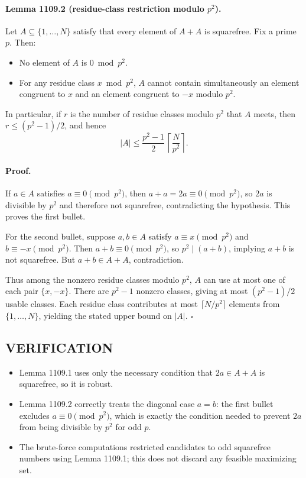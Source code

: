 \paragraph{Lemma 1109.2 (residue-class restriction modulo $p^2$).}
Let $A\subseteq\{1,\dots,N\}$ satisfy that every element of $A+A$ is squarefree.
Fix a prime $p$.
Then:
\begin{itemize}
\item No element of $A$ is $0\bmod p^2$.
\item For any residue class $x\bmod p^2$, $A$ cannot contain simultaneously an element congruent to $x$ and an element congruent to $-x$ modulo $p^2$.
\end{itemize}
In particular, if $r$ is the number of residue classes modulo $p^2$ that $A$ meets, then $r\le (p^2-1)/2$, and hence
\[|A|\le \frac{p^2-1}{2}\,\left\lceil \frac{N}{p^2}\right\rceil.
\]

\paragraph{Proof.}
If $a\in A$ satisfies $a\equiv 0\pmod{p^2}$, then $a+a=2a\equiv 0\pmod{p^2}$, so $2a$ is divisible by $p^2$ and therefore not squarefree, contradicting the hypothesis. This proves the first bullet.

For the second bullet, suppose $a,b\in A$ satisfy $a\equiv x\pmod{p^2}$ and $b\equiv -x\pmod{p^2}$. Then $a+b\equiv 0\pmod{p^2}$, so $p^2\mid (a+b)$, implying $a+b$ is not squarefree. But $a+b\in A+A$, contradiction.

Thus among the nonzero residue classes modulo $p^2$, $A$ can use at most one of each pair $\{x,-x\}$.
There are $p^2-1$ nonzero classes, giving at most $(p^2-1)/2$ usable classes.
Each residue class contributes at most $\lceil N/p^2\rceil$ elements from $\{1,\dots,N\}$, yielding the stated upper bound on $|A|$. \hfill $\square$

\subsection*{VERIFICATION}
\begin{itemize}
\item Lemma 1109.1 uses only the necessary condition that $2a\in A+A$ is squarefree, so it is robust.
\item Lemma 1109.2 correctly treats the diagonal case $a=b$: the first bullet excludes $a\equiv 0\pmod{p^2}$, which is exactly the condition needed to prevent $2a$ from being divisible by $p^2$ for odd $p$.
\item The brute-force computations restricted candidates to odd squarefree numbers using Lemma 1109.1; this does not discard any feasible maximizing set.
\end{itemize}

